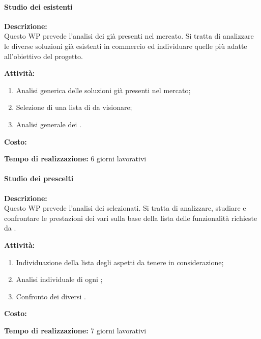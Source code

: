 \paragraph{Studio dei \sw esistenti }
\begin{description}
\item{\bfseries Descrizione:}\\
Questo WP prevede l'analisi dei \sw già presenti nel mercato. Si tratta di analizzare le diverse soluzioni già esistenti in commercio ed individuare quelle più adatte all'obiettivo del progetto. 

  \item  {\bfseries Attività:}
	\begin{enumerate}
		  \item Analisi generica delle soluzioni \sw già presenti nel mercato;
		  \item Selezione di una lista di \sw da visionare;
		  \item Analisi generale dei \sw.
		\end{enumerate}
  \item  {\bfseries Costo:}
  \item  {\bfseries Tempo di realizzazione:} 6 giorni lavorativi
\end{description}

\paragraph{Studio dei \sw prescelti}
\begin{description}
\item{\bfseries Descrizione:}\\
Questo WP prevede l'analisi dei \sw selezionati. Si tratta di analizzare, studiare e confrontare le prestazioni dei vari \sw sulla base della lista delle funzionalità richieste da \customer.

\item  {\bfseries Attività:}
\begin{enumerate}
		\item Individuazione della lista degli aspetti da tenere in considerazione;
		\item Analisi individuale di ogni \sw;
		\item Confronto dei diversi \sw.
		\end{enumerate}

\item  {\bfseries Costo:}
\item  {\bfseries Tempo di realizzazione:} 7 giorni lavorativi
\end{description}


